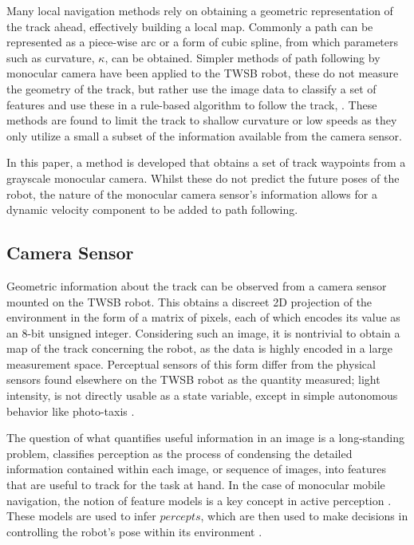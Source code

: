         Many local navigation methods rely on obtaining a geometric representation of the track ahead, effectively building a local map.
        Commonly a path can be represented as a piece-wise arc or a form of cubic spline, from which parameters such as curvature, $\kappa$, 
        can be obtained. Simpler methods of path following by monocular camera have been applied to the TWSB robot, these do not measure the 
        geometry of the track, but rather use the image data to classify a set of features and use these in a rule-based algorithm to follow the 
        track, \cite{visionlinetwsb} \cite{ismail2009vision} \cite{nntwsbvision}.
        These methods are found to limit the track to shallow curvature or low speeds as they only utilize a small 
        a subset of the information available from the camera sensor. 
       
        In this paper, a method is developed that obtains a set of track waypoints from a grayscale monocular camera. 
        Whilst these do not predict the future poses of the robot, the nature of the 
        monocular camera sensor's information allows for a dynamic velocity component to be added to path following.

        \subsection{Camera Sensor}
        Geometric information about the track can be observed from a camera sensor mounted on the TWSB robot.
        This obtains a discreet 2D projection of the environment in the form of a matrix of pixels, each of which encodes 
        its value as an 8-bit unsigned integer. Considering such an image, it is nontrivial to
        obtain a map of the track concerning the robot, as the data is highly encoded in a large measurement space. 
        Perceptual sensors of this form differ from the physical sensors found elsewhere on the TWSB robot as the quantity measured; 
        light intensity, is not directly usable as a state variable, except in simple autonomous behavior like photo-taxis \cite{hasslacher1995living}. 

        The question of what quantifies useful information in an image is a long-standing problem,  \cite{siegwart2011introduction} classifies 
        perception as the process of condensing the detailed information contained within each image, or sequence of images, 
        into features that are useful to track for the task at hand.
        In the case of monocular mobile navigation, the notion of feature models is a key concept in active perception \cite{Activeperception}.
        These models are used to infer $\textit{percepts}$, which are then used to make decisions in controlling the robot's pose within its environment 
                \cite{hutchinson1996tutorial}. 

